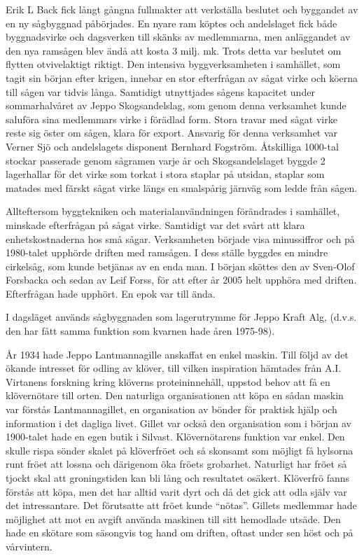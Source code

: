 
Erik L Back fick långt gångna fullmakter att verkställa beslutet och byggandet av en ny sågbyggnad påbörjades. En nyare ram köptes och andelslaget fick både byggnadsvirke och dagsverken till skänks av medlemmarna, men anläggandet av den nya ramsågen blev ändå att kosta 3 milj. mk. Trots detta var beslutet om flytten otvivelaktigt riktigt. Den intensiva byggverksamheten i samhället, som tagit sin början efter krigen, innebar en stor efterfrågan av sågat virke och köerna till sågen var tidvis långa. Samtidigt utnyttjades sågens kapacitet under sommarhalvåret av Jeppo Skogsandelslag, som genom denna verksamhet kunde saluföra sina medlemmars virke i förädlad form. Stora travar med sågat virke reste sig öster om sågen, klara för export. Ansvarig för denna verksamhet var Verner Sjö och andelslagets disponent Bernhard Fogström. Åtskilliga 1000-tal stockar passerade genom sågramen varje år och Skogsandelslaget byggde 2 lagerhallar för det virke som torkat i stora staplar på utsidan, staplar som matades med färskt sågat virke längs en smalspårig järnväg som ledde från sågen.

Allteftersom byggtekniken och materialanvändningen förändrades i samhället, minskade efterfrågan på sågat virke. Samtidigt var det svårt att klara enhetskostnaderna hos små sågar. Verksamheten började visa minussiffror och på 1980-talet upphörde driften med ramsågen. I dess ställe byggdes en mindre cirkelsåg, som kunde betjänas av en enda man. I början sköttes den av Sven-Olof Forsbacka och sedan av Leif Forss, för att efter år 2005 helt upphöra med driften. Efterfrågan hade upphört. En epok var till ända.

I dagsläget används sågbyggnaden som lagerutrymme för Jeppo Kraft Alg, (d.v.s. den har fått samma funktion som kvarnen hade åren 1975-98).




År 1934 hade Jeppo Lantmannagille anskaffat en enkel maskin. Till följd av det ökande intresset för odling av klöver, till vilken inspiration  hämtades från A.I. Virtanens forskning kring klöverns proteininnehåll, uppstod behov att få en klövernötare till  orten. Den naturliga organisationen att köpa en sådan maskin var förstås Lantmannagillet, en  organisation  av  bönder för praktisk hjälp och information i det dagliga livet. Gillet var också den organisation som i början av 1900-talet hade en egen butik i Silvast.
Klövernötarens funktion var enkel. Den skulle rispa sönder skalet på klöverfröet och så skonsamt som möjligt få hylsorna runt fröet att lossna och därigenom öka fröets grobarhet. Naturligt har fröet så tjockt skal att groningstiden kan bli lång och resultatet osäkert. Klöverfrö fanns förstås att köpa, men det har alltid varit dyrt och då det gick att odla själv var det intressantare. Det förutsatte att fröet kunde ``nötas''. Gillets medlemmar hade möjlighet att mot en avgift använda maskinen till sitt hemodlade utsäde. Den hade en skötare som säsongvis tog hand om driften, oftast under sen höst och på vårvintern.

